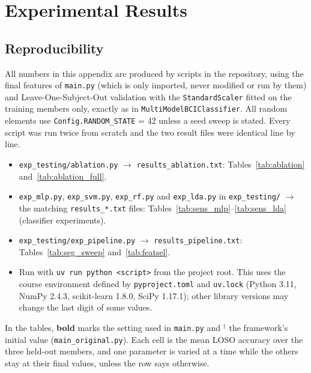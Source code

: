 \section{Experimental Results}\label{app:app02}

\subsection{Reproducibility}
All numbers in this appendix are produced by scripts in the repository, using the final features of \texttt{main.py} (which is only imported, never modified or run by them) and Leave-One-Subject-Out validation with the \texttt{StandardScaler} fitted on the training members only, exactly as in \texttt{MultiModelBCIClassifier}. All random elements use \texttt{Config.RANDOM\_STATE} = 42 unless a seed sweep is stated. Every script was run twice from scratch and the two result files were identical line by line.
\begin{itemize}[leftmargin=*]
    \item \texttt{exp\_testing/ablation.py} $\rightarrow$ \texttt{results\_ablation.txt}: Tables~\ref{tab:ablation} and~\ref{tab:ablation_full}.
    \item \texttt{exp\_mlp.py}, \texttt{exp\_svm.py}, \texttt{exp\_rf.py} and \texttt{exp\_lda.py} in \texttt{exp\_testing/} $\rightarrow$ the matching \texttt{results\_*.txt} files: Tables~\ref{tab:sens_mlp}--\ref{tab:sens_lda} (classifier experiments).
    \item \texttt{exp\_testing/exp\_pipeline.py} $\rightarrow$ \texttt{results\_pipeline.txt}: Tables~\ref{tab:seg_sweep} and~\ref{tab:featsel}.
    \item Run with \texttt{uv run python <script>} from the project root. This uses the course environment defined by \texttt{pyproject.toml} and \texttt{uv.lock} (Python 3.11, NumPy 2.4.3, scikit-learn 1.8.0, SciPy 1.17.1); other library versions may change the last digit of some values.
\end{itemize}
In the tables, \textbf{bold} marks the setting used in \texttt{main.py} and $^{\dagger}$ the framework's initial value (\texttt{main\_original.py}). Each cell is the mean LOSO accuracy over the three held-out members, and one parameter is varied at a time while the others stay at their final values, unless the row says otherwise.

\FloatBarrier
